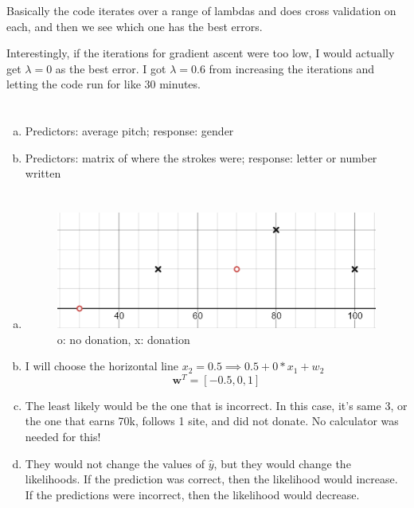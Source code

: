 \documentclass[12pt]{article}
\begin{document}
Basically the code iterates over a range of lambdas and does cross validation on each, and then we see which one has the best errors.

Interestingly, if the iterations for gradient ascent were too low, I would actually get $ \lambda = 0 $ as the best error. I got $ \lambda = 0.6 $ from increasing the iterations and letting the code run for like 30 minutes. 
\newpage

\section{}
\begin{enumerate}[(a)]
	\item Predictors: average pitch; response: gender
	
	\item Predictors: matrix of where the strokes were; response: letter or number written
\end{enumerate}
\newpage

\section{}
\begin{enumerate}[(a)]
	\item 
	\begin{figure}[H]
		\centering
		\includegraphics{images/6a.png}
		\caption{o: no donation, x: donation}
		\label{figure:6b}
	\end{figure}

	\item I will choose the horizontal line $ x_2 = 0.5 \implies 0.5 +0 * x_1 + w_2$
	\[ \mathbf{w}^T = [-0.5, 0, 1] \]
	
	\item The least likely would be the one that is incorrect. In this case, it's same 3, or the one that earns 70k, follows 1 site, and did not donate. No calculator was needed for this!
	
	\item They would not change the values of $ \hat{y} $, but they would change the likelihoods. If the prediction was correct, then the likelihood would increase. If the predictions were incorrect, then the likelihood would decrease.
\end{enumerate}
\end{document}
